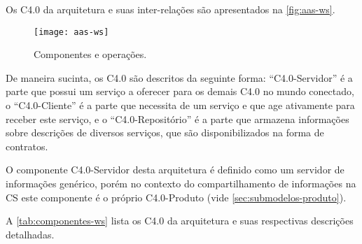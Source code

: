 Os C4.0 da arquitetura e suas inter-relações são apresentados na \autoref{fig:aas-ws}.

\begin{figure}[htb]
	\centering
	\texttt{[image: aas-ws]}
	\caption{Componentes e operações.}
	\label{fig:aas-ws}
\end{figure}

De maneira sucinta, os C4.0 são descritos da seguinte forma: ``C4.0-Servidor'' é a parte que possui um serviço a oferecer para os demais C4.0 no mundo conectado, o ``C4.0-Cliente'' é a parte que necessita de um serviço e que age ativamente para receber este serviço, e o ``C4.0-Repositório'' é a parte que armazena informações sobre descrições de diversos serviços, que são disponibilizados na forma de contratos.

O componente C4.0-Servidor desta arquitetura é definido como um servidor de informações genérico, porém no contexto do compartilhamento de informações na CS este componente é o próprio C4.0-Produto (vide \autoref{sec:submodelos-produto}).

A \autoref{tab:componentes-ws} lista os C4.0 da arquitetura e suas respectivas descrições detalhadas.

